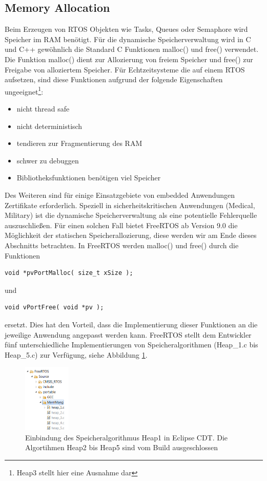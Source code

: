 \subsection{Memory Allocation}
Beim Erzeugen von RTOS Objekten wie Tasks, Queues oder Semaphore wird Speicher im RAM benötigt. Für die dynamische Speicherverwaltung wird in C und C++ ge\-wöhnlich die Standard C Funktionen malloc() und free() verwendet. Die Funktion malloc() dient zur Allozierung von freiem Speicher und free() zur Freigabe von alloziertem Speicher. Für Echtzeitsysteme die auf einem RTOS aufsetzen, sind diese Funktionen aufgrund der folgende Eigenschaften\cite{MasteringFreeRtos} ungeeignet\footnote{Heap3 stellt hier eine Ausnahme dar}:
\begin{itemize}
	\item nicht thread safe
	\item nicht deterministisch
	\item tendieren zur Fragmentierung des RAM
	\item schwer zu debuggen
	\item Bibliotheksfunktionen benötigen viel Speicher
\end{itemize}
Des Weiteren sind für einige Einsatzgebiete von embedded Anwendungen Zertifikate erforderlich. Speziell in sicherheitskritischen Anwendungen (Medical, Military) ist die dynamische Speicherverwaltung als eine potentielle Fehlerquelle auszuschließen. Für einen solchen Fall bietet FreeRTOS ab Version 9.0 die Möglichkeit der statischen Speicherallozierung, diese werden wir am Ende dieses Abschnitts betrachten. In FreeRTOS werden malloc() und free() durch die Funktionen  
\begin{lstlisting}[label=lst:vPortMalloc1, numbers = none]
void *pvPortMalloc( size_t xSize );
\end{lstlisting}
und
\begin{lstlisting}[label=lst:vPortFree1, numbers = none]
void vPortFree( void *pv );
\end{lstlisting}
ersetzt. Dies hat den Vorteil, dass die Implementierung dieser Funktionen an die jeweilige Anwendung angepasst werden kann. FreeRTOS stellt dem Entwickler fünf unterschiedliche Implementierungen von Speicheralgorithmen (Heap\_1.c bis Heap\_5.c) zur Verfügung, siehe Abbildung \ref{fig:HeapsEclipse}. 
\begin{figure}[htb]
	\centering
		\includegraphics[width=0.2\textwidth]{Pictures/Eclipse/Heaps.png}
	\caption{Einbindung des Speicheralgorithmus Heap1 in Eclipse CDT. Die Algortihmen Heap2 bis Heap5 sind vom Build ausgeschlossen}
	\label{fig:HeapsEclipse}
\end{figure}
